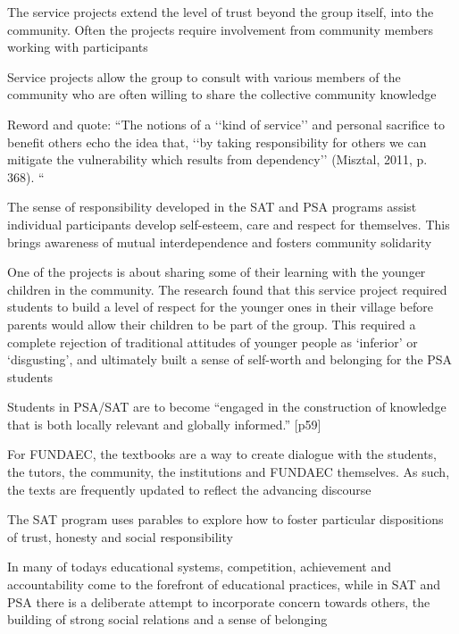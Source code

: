 The service projects extend the level of trust beyond the group itself, into the community. Often the projects require involvement from community members working with participants \citep{Murphy-Graham2014}

Service projects allow the group to consult with various members of the community who are often willing to share the collective community knowledge \citep{Murphy-Graham2014}



Reword and quote: “The notions of a ‘‘kind of service’’ and personal sacrifice to benefit others echo the idea that, ‘‘by taking responsibility for others we can mitigate the vulnerability which results from dependency’’ (Misztal, 2011, p. 368). “ \citep{Murphy-Graham2014}

The sense of responsibility developed in the SAT and PSA programs assist individual participants develop self-esteem, care and respect for themselves. This brings awareness of mutual interdependence and fosters community solidarity \citep{Murphy-Graham2014}

One of the projects is about sharing some of their learning with the younger children in the community. The research found that this service project required students to build a level of respect for the younger ones in their village before parents would allow their children to be part of the group. This required a complete rejection of traditional attitudes of younger people as `inferior' or `disgusting', and ultimately built a sense of self-worth and belonging for the PSA students \citep{Murphy-Graham2014}

Students in PSA/SAT are to become “engaged in the construction of knowledge that is both locally relevant and globally informed.” [p59] \citep{Murphy-Graham2014}

For FUNDAEC, the textbooks are a way to create dialogue with the students, the tutors, the community, the institutions and FUNDAEC themselves. As such, the texts are frequently updated to reflect the advancing discourse \citep{Murphy-Graham2014}

The SAT program uses parables to explore how to foster particular dispositions of trust, honesty and social responsibility \citep{Murphy-Graham2014}

In many of todays educational systems, competition, achievement and accountability come to the forefront of educational practices, while in SAT and PSA there is a deliberate attempt to incorporate concern towards others, the building of strong social relations and a sense of belonging \citep{Murphy-Graham2014}

